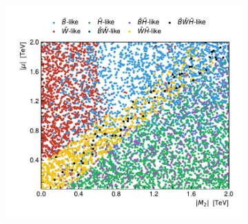 \begin{figure}[H]
\begin{subfigure}[b]{0.47\linewidth}
		\centering\includegraphics[width=\textwidth]{scatter/lsp_types_mu_M2}
	\end{subfigure}\hfill
	

\end{figure}
